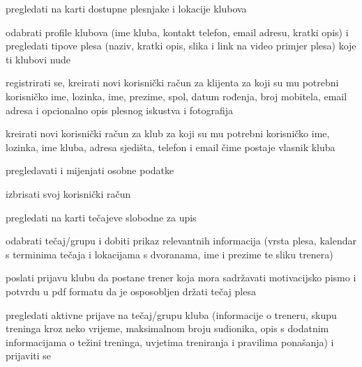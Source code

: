 			
			\begin{packed_enum}
				\item  {}
				
				\begin{packed_enum}
					\item pregledati na karti dostupne plesnjake i lokacije klubova
					\item odabrati profile klubova (ime kluba, kontakt telefon, email adresu, kratki opis)  i pregledati tipove plesa (naziv, kratki opis, slika i link na video primjer plesa) koje ti klubovi nude
					\item registrirati se, kreirati novi korisnički račun za klijenta za koji su mu potrebni korisničko ime, lozinka, ime, prezime, spol, datum rođenja, broj mobitela, email adresa i opcionalno opis plesnog iskustva i fotografija
					\item kreirati novi korisnički račun za klub za koji su mu potrebni korisničko ime, lozinka, ime kluba, adresa sjedišta, telefon i email čime postaje vlasnik kluba

					
				\end{packed_enum}
			
				\item  {}
				
				\begin{packed_enum}
					
					\item pregledavati i mijenjati osobne podatke
					\item izbrisati svoj korisnički račun
					\item  pregledati na karti tečajeve slobodne za upis 
					\item odabrati tečaj/grupu i dobiti prikaz relevantnih informacija (vrsta plesa, kalendar s terminima tečaja i lokacijama s dvoranama, ime i prezime te sliku trenera)
					\item poslati prijavu klubu da postane trener koja mora sadržavati motivacijsko pismo i potvrdu u pdf formatu da je osposobljen držati tečaj plesa
					\item pregledati aktivne prijave na tečaj/grupu kluba (informacije o treneru, skupu treninga kroz neko vrijeme, maksimalnom broju sudionika, opis s dodatnim informacijama o težini treninga, uvjetima treniranja i pravilima ponašanja) i prijaviti se

					
				\end{packed_enum}
			

\end{packed_enum}
